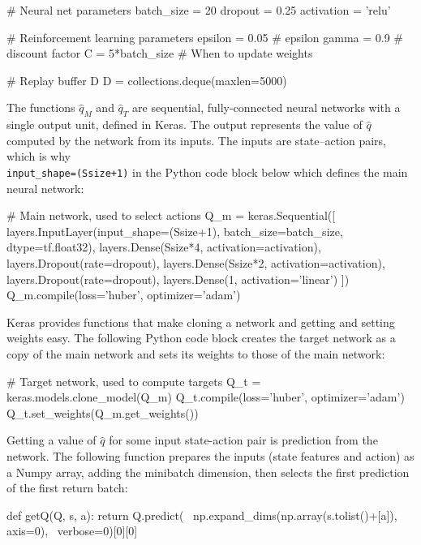 \begin{pythoncode}
# Neural net parameters
batch_size = 20
dropout = 0.25
activation = 'relu'

# Reinforcement learning parameters
epsilon = 0.05 # epsilon
gamma = 0.9 # discount factor
C = 5*batch_size # When to update weights

# Replay buffer D
D = collections.deque(maxlen=5000)
\end{pythoncode}

The functions $\hat{q}_M$ and $\hat{q}_T$ are sequential, fully-connected neural networks with a single output unit, defined in Keras. The output represents the value of $\hat{q}$ computed by the network from its inputs. The inputs are state--action pairs, which is why \\
{\small \texttt{input\_shape=(Ssize+1)}} in the Python code block below which defines the main neural network:

\begin{pythoncode}
# Main network, used to select actions
Q_m = keras.Sequential([
    layers.InputLayer(input_shape=(Ssize+1),
                      batch_size=batch_size,
                      dtype=tf.float32),
    layers.Dense(Ssize*4, activation=activation),
    layers.Dropout(rate=dropout),
    layers.Dense(Ssize*2, activation=activation),
    layers.Dropout(rate=dropout),
    layers.Dense(1, activation='linear')
])
Q_m.compile(loss='huber', optimizer='adam')
\end{pythoncode}

Keras provides functions that make cloning a network and getting and setting weights easy. The following Python code block creates the target network as a copy of the main network and sets its weights to those of the main network:

\begin{pythoncode}
# Target network, used to compute targets
Q_t = keras.models.clone_model(Q_m)
Q_t.compile(loss='huber', optimizer='adam')
Q_t.set_weights(Q_m.get_weights())
\end{pythoncode}

Getting a value of $\hat{q}$ for some input state-action pair is prediction from the network. The following function prepares the inputs (state features and action) as a Numpy array, adding the minibatch dimension, then selects the first prediction of the first return batch:

\begin{pythoncode}
def getQ(Q, s, a):
    return Q.predict( \
        np.expand_dims(np.array(s.tolist()+[a]), axis=0), \
        verbose=0)[0][0]
\end{pythoncode}

